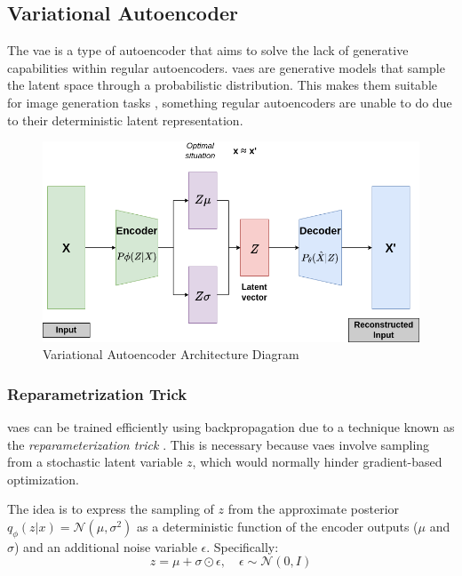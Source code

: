 \subsection{Variational Autoencoder}
\label{back:vae}

The \acrfull{vae} \cite{kingma2022autoencodingvariationalbayes} is a type of autoencoder that aims to solve the lack of generative capabilities within regular autoencoders. \acrshort{vae}s are generative models that sample the latent space through a probabilistic distribution. This makes them suitable for image generation tasks \cite{vahdat2020nvae}, something regular autoencoders are unable to do due to their deterministic latent representation.

\begin{figure}[!h]
    \centering
    \includegraphics[scale=0.4]{figures/vae.png}
    \caption{Variational Autoencoder Architecture Diagram}
    \label{fig:vaediagram}
\end{figure}


\subsubsection{Reparametrization Trick}

\acrshort{vae}s can be trained efficiently using backpropagation due to a technique known as the \textit{reparameterization trick} \cite{kingma2022autoencodingvariationalbayes}. This is necessary because \acrshort{vae}s involve sampling from a stochastic latent variable $z$, which would normally hinder gradient-based optimization.

The idea is to express the sampling of $z$ from the approximate posterior $q_\phi(z|x) = \mathcal{N}(\mu, \sigma^2)$ as a deterministic function of the encoder outputs ($\mu$ and $\sigma$) and an additional noise variable $\epsilon$. Specifically:
\begin{equation}
    z = \mu + \sigma \odot \epsilon, \quad \epsilon \sim \mathcal{N}(0, I)
\end{equation}

